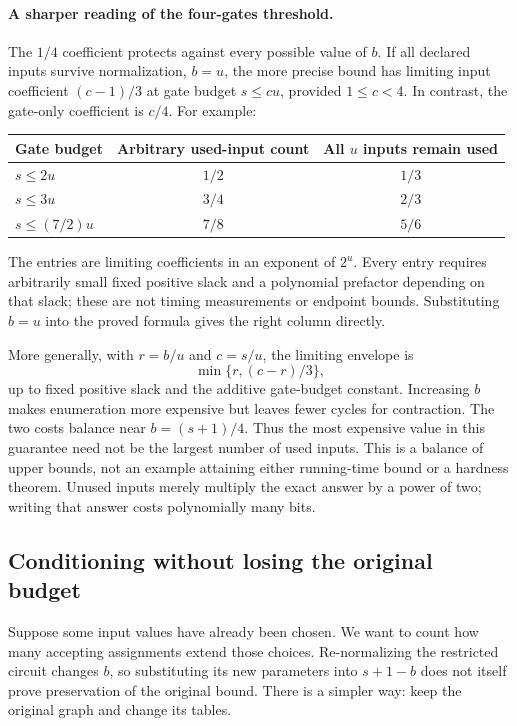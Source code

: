 \paragraph{A sharper reading of the four-gates threshold.}
The $1/4$ coefficient protects against every possible value of $b$.
If all declared inputs survive normalization, $b=u$, the more precise
bound has limiting input coefficient $(c-1)/3$ at gate budget
$s\le cu$, provided $1\le c<4$. In contrast, the gate-only
coefficient is $c/4$. For example:
\begin{center}
\begin{tabular}{@{}lcc@{}}
\toprule
Gate budget & Arbitrary used-input count & All $u$ inputs remain used\\
\midrule
$s\le2u$ & $1/2$ & $1/3$\\
$s\le3u$ & $3/4$ & $2/3$\\
$s\le(7/2)u$ & $7/8$ & $5/6$\\
\bottomrule
\end{tabular}
\end{center}
The entries are limiting coefficients in an exponent of $2^u$.
Every entry requires arbitrarily small fixed positive slack and a
polynomial prefactor depending on that slack; these are not timing
measurements or endpoint bounds. Substituting $b=u$ into the proved
formula gives the right column directly.

More generally, with $r=b/u$ and $c=s/u$, the limiting envelope is
\[
 \min\{r,(c-r)/3\},
\]
up to fixed positive slack and the additive gate-budget constant.
Increasing $b$ makes enumeration more expensive but leaves fewer
cycles for contraction. The two costs balance near $b=(s+1)/4$.
Thus the most expensive value in this guarantee need not be the
largest number of used inputs. This is a balance of upper bounds,
not an example attaining either running-time bound or a hardness
theorem. Unused inputs merely multiply the exact answer by a power
of two; writing that answer costs polynomially many bits.

\subsection{Conditioning without losing the original budget}

Suppose some input values have already been chosen. We want to count
how many accepting assignments extend those choices. Re-normalizing
the restricted circuit changes $b$, so substituting its new parameters
into $s+1-b$ does not itself prove preservation of the original bound.
There is a simpler way: keep the original graph and change its tables.

